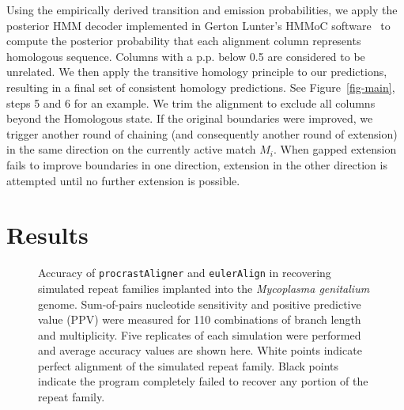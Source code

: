 \documentclass{ws-procs975x65}
\begin{document}
Using the empirically derived transition and emission probabilities, we apply the posterior HMM decoder implemented in Gerton Lunter's HMMoC software~\cite{hmmoc} to compute the posterior probability that each alignment column represents homologous sequence.  Columns with a p.p. below 0.5 are considered to be unrelated.  We then apply the transitive homology principle to our predictions, resulting in a final set of consistent homology predictions.  See Figure~\ref{fig-main}, steps 5 and 6 for an example. We trim the alignment to exclude all columns beyond the Homologous state. If the original boundaries were improved, we trigger another round of chaining (and consequently another round of extension) in the same direction on the currently active match $M_i$.  When gapped extension fails to improve boundaries in one direction, extension in the other direction is attempted until no further extension is possible.


\section{Results}
\begin{figure}[t]
\centering {}
\caption{Accuracy of \texttt{procrastAligner} and \texttt{eulerAlign} in recovering simulated repeat families implanted into the \textit{Mycoplasma genitalium} genome.  Sum-of-pairs nucleotide sensitivity and positive predictive value (PPV) were measured for 110 combinations of branch length and multiplicity.  Five replicates of each simulation were performed and
average accuracy values are shown here.  White points indicate perfect alignment of the simulated repeat family.  Black points indicate the program completely failed to recover any portion of the repeat family.}
\label{fig-results}\vspace{-0.2cm}
\end{figure}


%
%
\end{document}
